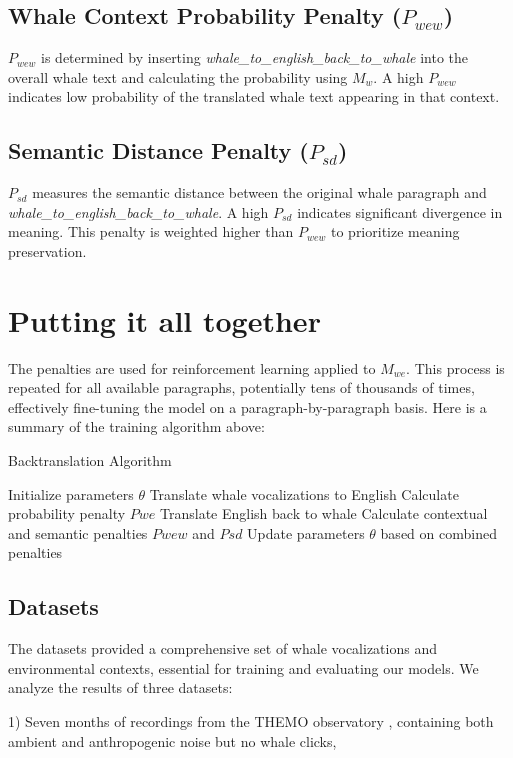 \documentclass{article}
\begin{document}
\subsection{Whale Context Probability Penalty ($P_{wew}$)}
$P_{wew}$ is determined by inserting \textit{whale\_to\_english\_back\_to\_whale} into the overall whale text and calculating the probability using $M_w$. A high $P_{wew}$ indicates low probability of the translated whale text appearing in that context.

\subsection{Semantic Distance Penalty ($P_{sd}$)}
$P_{sd}$ measures the semantic distance between the original whale paragraph and \textit{whale\_to\_english\_back\_to\_whale}. A high $P_{sd}$ indicates significant divergence in meaning. This penalty is weighted higher than $P_{wew}$ to prioritize meaning preservation.

\section{Putting it all together}
The penalties are used for reinforcement learning applied to $M_{we}$. This process is repeated for all available paragraphs, potentially tens of thousands of times, effectively fine-tuning the model on a paragraph-by-paragraph basis.
Here is a summary of the training algorithm above:
\begin{algorithm}
\caption{Backtranslation Algorithm}
\begin{algorithmic}[1]
\STATE Initialize parameters $\theta$
\STATE Translate whale vocalizations to English
\STATE Calculate probability penalty $Pwe$
\STATE Translate English back to whale
\STATE Calculate contextual and semantic penalties $Pwew$ and $Psd$
\STATE Update parameters $\theta$ based on combined penalties
\ENDFOR
\end{algorithmic}
\end{algorithm}
\subsection{Datasets}
The datasets provided a comprehensive set of whale vocalizations and environmental contexts, essential for training and evaluating our models.
We analyze the results of three datasets: 

1) Seven months of recordings from the THEMO observatory \cite{themo}, containing both ambient and anthropogenic noise but no whale clicks, 
\end{document}

